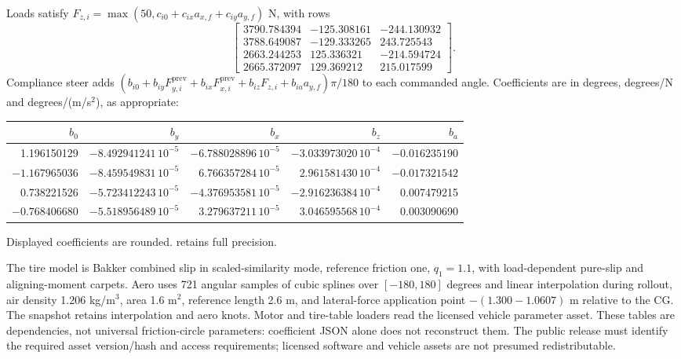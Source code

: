 \documentclass[11pt]{article}
\newcommand{\src}[1]{\texttt{\detokenize{#1}}}
\begin{document}
Loads satisfy $F_{z,i}=\max(50,c_{i0}+c_{ix}a_{x,f}+c_{iy}a_{y,f})$ N, with rows
\[
\begin{bmatrix}
3790.784394&-125.308161&-244.130932\\
3788.649087&-129.333265&243.725543\\
2663.244253&125.336321&-214.594724\\
2665.372097&129.369212&215.017599
\end{bmatrix}.
\]
Compliance steer adds $(b_{i0}+b_{iy}F_{y,i}^{\mathrm{prev}}+b_{ix}F_{x,i}^{\mathrm{prev}}+b_{iz}F_{z,i}+b_{ia}a_{y,f})\pi/180$ to each commanded angle. Coefficients are in degrees, degrees/N and degrees/(m/s$^2$), as appropriate:
\begin{center}\small
\begin{tabular}{rrrrr}
\toprule$b_0$ & $b_y$ & $b_x$ & $b_z$ & $b_a$\\\midrule
1.196150129 & $-8.492941241\,10^{-5}$ & $-6.788028896\,10^{-5}$ & $-3.033973020\,10^{-4}$ & $-0.016235190$\\
$-1.167965036$ & $-8.459549831\,10^{-5}$ & $6.766357284\,10^{-5}$ & $2.961581430\,10^{-4}$ & $-0.017321542$\\
0.738221526 & $-5.723412243\,10^{-5}$ & $-4.376953581\,10^{-5}$ & $-2.916236384\,10^{-4}$ & 0.007479215\\
$-0.768406680$ & $-5.518956489\,10^{-5}$ & $3.279637211\,10^{-5}$ & $3.046595568\,10^{-4}$ & 0.003090690\\\bottomrule
\end{tabular}\end{center}
Displayed coefficients are rounded. \src{physics_parameters.json} retains full precision.

The tire model is Bakker combined slip in scaled-similarity mode, reference friction one, $q_1=1.1$, with load-dependent pure-slip and aligning-moment carpets. Aero uses 721 angular samples of cubic splines over $[-180,180]$ degrees and linear interpolation during rollout, air density 1.206 kg/m$^3$, area 1.6 m$^2$, reference length 2.6 m, and lateral-force application point $-(1.300-1.0607)$ m relative to the CG. The snapshot retains interpolation and aero knots. Motor and tire-table loaders read the licensed vehicle parameter asset. These tables are dependencies, not universal friction-circle parameters: coefficient JSON alone does not reconstruct them. The public release must identify the required asset version/hash and access requirements; licensed software and vehicle assets are not presumed redistributable.
\end{document}
